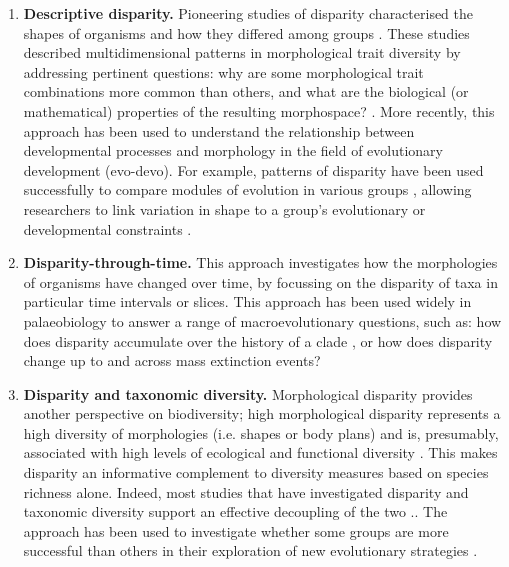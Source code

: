 \documentclass[12pt,letterpaper]{article}
\begin{document}
\begin{enumerate}

	\item \textbf{Descriptive disparity.} Pioneering studies of disparity characterised the shapes of organisms and how they differed among groups \citep{Foote1995, Briggs1992}.
	These studies described multidimensional patterns in morphological trait diversity by addressing pertinent questions: why are some morphological trait combinations more common than others, and what are the biological (or mathematical) properties of the resulting morphospace? \citep{Foote1995, Raup1961, Gerber2017}.
	More recently, this approach has been used to understand the relationship between developmental processes and morphology in the field of evolutionary development (evo-devo).
	For example, patterns of disparity have been used successfully to compare modules of evolution in various groups \citep{goswami2010influence,bardua2019morphological}, allowing researchers to link variation in shape to a group's evolutionary or developmental constraints \citep{Hipsley2017}.

	\item \textbf{Disparity-through-time.} This approach investigates how the morphologies of organisms have changed over time, by focussing on the disparity of taxa in particular time intervals or slices.
	This approach has been used widely in palaeobiology to answer a range of macroevolutionary questions, such as: how does disparity accumulate over the history of a clade \citep{prentice2011evolution, Guillerme2018}, or how does disparity change up to and across mass extinction events\citep{Friedman2010}?

	\item \textbf{Disparity and taxonomic diversity.} Morphological disparity provides another perspective on biodiversity; high morphological disparity represents a high diversity of morphologies (i.e.
	shapes or body plans) and is, presumably, associated with high levels of ecological and functional diversity \citep[but see][]{anderson2012}.
	This makes disparity an informative complement to diversity measures based on species richness alone.
	Indeed, most studies that have investigated disparity and taxonomic diversity support an effective decoupling of the two \citep[e.g.][]{Fortey1996, Hopkins2013}..
	The approach has been used to investigate whether some groups are more successful than others in their exploration of new evolutionary strategies \citep{pierce2008patterns}.


\end{enumerate}
\end{document}
